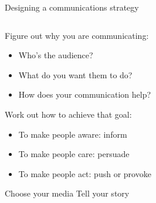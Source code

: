 \begin{frame}{Designing a communications strategy}

\begin{columns}

    \begin{column}{0.45\textwidth}
        \begin{minipage}[t][.7\textheight]{\textwidth}
        
        Figure out why you are communicating:
        \begin{itemize}
            \item Who's the audience?
            \item What do you want them to do?
            \item How does your communication help?
        \end{itemize}
        \vfill
        Work out how to achieve that goal:
        \begin{itemize}
            \item To make people aware: inform
            \item To make people care: persuade
            \item To make people act: push or provoke
        \end{itemize}
        \vfill
        Choose your media
        \vfill
        Tell your story
        \end{minipage}
    \end{column}

    \begin{column}{0.45\textwidth}

    \end{column}

\end{columns}


\end{frame}